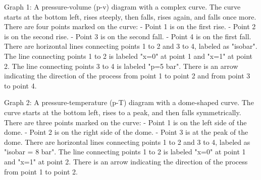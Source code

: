 Graph 1: A pressure-volume (p-v) diagram with a complex curve. The curve starts at the bottom left, rises steeply, then falls, rises again, and falls once more. There are four points marked on the curve:
- Point 1 is on the first rise.
- Point 2 is on the second rise.
- Point 3 is on the second fall.
- Point 4 is on the first fall.
There are horizontal lines connecting points 1 to 2 and 3 to 4, labeled as "isobar". The line connecting points 1 to 2 is labeled "x=0" at point 1 and "x=1" at point 2. The line connecting points 3 to 4 is labeled "p=5 bar". There is an arrow indicating the direction of the process from point 1 to point 2 and from point 3 to point 4.

Graph 2: A pressure-temperature (p-T) diagram with a dome-shaped curve. The curve starts at the bottom left, rises to a peak, and then falls symmetrically. There are three points marked on the curve:
- Point 1 is on the left side of the dome.
- Point 2 is on the right side of the dome.
- Point 3 is at the peak of the dome.
There are horizontal lines connecting points 1 to 2 and 3 to 4, labeled as "isobar = 8 bar". The line connecting points 1 to 2 is labeled "x=0" at point 1 and "x=1" at point 2. There is an arrow indicating the direction of the process from point 1 to point 2.